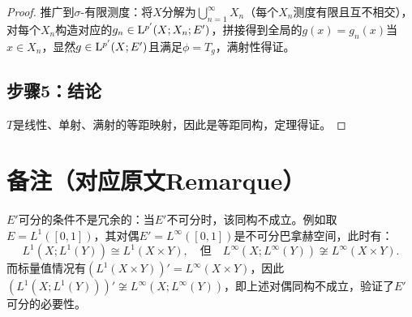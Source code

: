 \begin{proof}
推广到$\sigma$-有限测度：将$X$分解为$\bigcup_{n=1}^\infty X_n$（每个$X_n$测度有限且互不相交），对每个$X_n$构造对应的$g_n\in\mathrm{L}^{p'}(X;X_n;E')$，拼接得到全局的$g(x) = g_n(x)$当$x\in X_n$，显然$g\in\mathrm{L}^{p'}(X;E')$且满足$\phi=T_g$，满射性得证。

\subsection{步骤5：结论}
$T$是线性、单射、满射的等距映射，因此是等距同构，定理得证。
\end{proof}

\section{备注（对应原文Remarque）}
\begin{remark}
$E'$可分的条件不是冗余的：当$E'$不可分时，该同构不成立。例如取$E = L^1([0,1])$，其对偶$E' = L^\infty([0,1])$是不可分巴拿赫空间，此时有：
$$
L^1(X; L^1(Y)) \cong L^1(X\times Y), \quad \text{但} \quad L^\infty(X; L^\infty(Y)) \not\cong L^\infty(X\times Y).
$$
而标量值情况有$(L^1(X\times Y))' = L^\infty(X\times Y)$，因此$(L^1(X; L^1(Y)))' \not\cong L^\infty(X; L^\infty(Y))$，即上述对偶同构不成立，验证了$E'$可分的必要性。
\end{remark}


